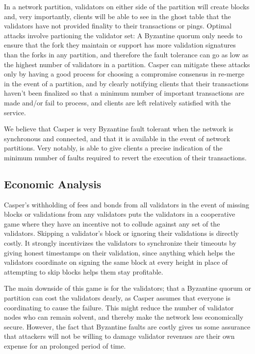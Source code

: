 \documentclass[11pt,a4paper]{article}
\begin{document}
In a network partition, validators on either side of the partition will create blocks and, very importantly, clients will be able to see in the ghost table that the validators have not provided finality to their transactions or pings. Optimal attacks involve partioning the validator set: A Byzantine quorum only needs to ensure that the fork they maintain or support has more validation signatures than the forks in any partition, and therefore the fault tolerance can go as low as the highest number of validators in a partition. Casper can mitigate these attacks only by having a good process for choosing a compromise consensus in re-merge in the event of a partition, and by clearly notifying clients that their transactions haven't been finalized so that a minimum number of important transactions are made and/or fail to process, and clients are left relatively satisfied with the service.

We believe that Casper is very Byzantine fault tolerant when the network is synchronous and connected, and that it is available in the event of network partitions. Very notably, is able to give clients a precise indication of the minimum number of faults required to revert the execution of their transactions.


\subsection{Economic Analysis}


Casper's withholding of fees and bonds from all validators in the event of missing blocks or validations from any validators puts the validators in a cooperative game where they have an incentive not to collude against any set of the validators. Skipping a validator's block or ignoring their validations is directly costly. It strongly incentivizes the validators to synchronize their timeouts by giving honest timestamps on their validation, since anything which helps the validators coordinate on signing the same block at every height in place of attempting to skip blocks helps them stay profitable. 

The main downside of this game is for the validators; that a Byzantine quorum or partition can cost the validators dearly, as Casper assumes that everyone is coordinating to cause the failure. This might reduce the number of validator nodes who can remain solvent, and thereby make the network less economically secure. However, the fact that Byzantine faults are costly gives us some assurance that attackers will not be willing to damage validator revenues are their own expense for an prolonged period of time.
\end{document}
